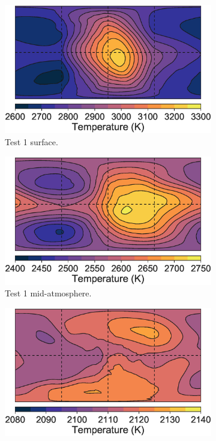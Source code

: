 \begin{figure}
  \begin{subfigure}[t]{0.32\textwidth}
    \includegraphics[width=\textwidth]{figures/linking-climate-55cnce/H210bar_surfp.eps}
    \caption{Test 1 surface.}
    \label{fig:free-u-shear}
  \end{subfigure}
\enskip
  \begin{subfigure}[t]{0.32\textwidth}
    \includegraphics[width=\textwidth]{figures/linking-climate-55cnce/H210bar_halfp.eps}
    \caption{Test 1 mid-atmosphere.}
    \label{fig:free-v-shear}
  \end{subfigure}
\enskip
  \begin{subfigure}[t]{0.32\textwidth}
    \includegraphics[width=\textwidth]{figures/linking-climate-55cnce/H210bar_brightT.eps}

\end{subfigure}
\end{figure}
